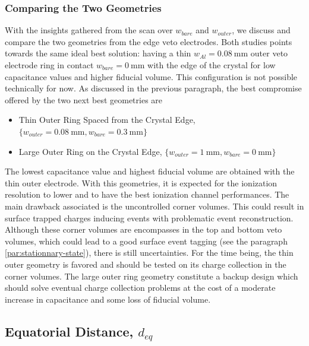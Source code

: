 \subsubsection{Comparing the Two Geometries}

With the insights gathered from the scan over $w_{bare}$ and $w_{outer}$, we discuss and compare the two geometries from the edge veto electrodes. Both studies points towards the same ideal best solution: having a thin $w_{Al} = \SI{0.08}{\mm}$ outer veto electrode ring in contact $w_{bare}=\SI{0}{\mm}$ with the edge of the crystal for low capacitance values and higher fiducial volume. This configuration is not possible technically for now. As discussed in the previous paragraph, the best compromise offered by the two next best geometries are
\begin{itemize}
	\item Thin Outer Ring Spaced from the Crystal Edge, $\{ w_{outer} = \SI{0.08}{\mm}, w_{bare} = \SI{0.3}{\mm} \}$
	\item Large Outer Ring on the Crystal Edge, $\{ w_{outer} = \SI{1}{\mm}, w_{bare} = \SI{0}{\mm} \}$
\end{itemize}

The lowest capacitance value and highest fiducial volume are obtained with the thin outer electrode. With this geometries, it is expected for the ionization resolution to lower and to have the best ionization channel performances. The main drawback associated is the uncontrolled corner volumes. This could result in surface trapped charges inducing events with problematic event reconstruction. Although these corner volumes are encompasses in the top and bottom veto volumes, which could lead to a good surface event tagging (see the paragraph \ref{par:stationnary-state}), there is still uncertainties.
For the time being, the thin outer geometry is favored and should be tested on its charge collection in the corner volumes. The large outer ring geometry constitute a backup design which should solve eventual charge collection problems at the cost of a moderate increase in capacitance and some loss of fiducial volume.



\subsection{Equatorial Distance, $d_{eq}$}
\label{par:equatorial-distance}

